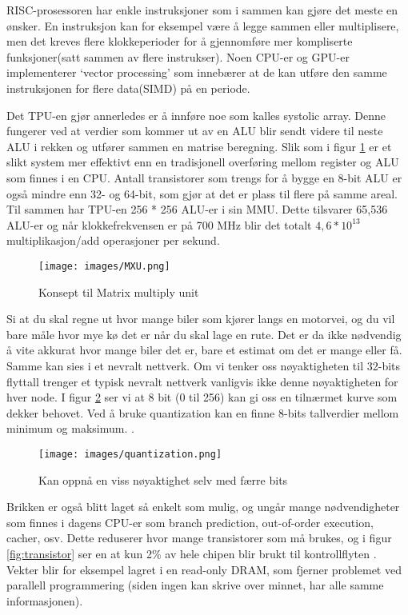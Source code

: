 RISC-prosessoren har enkle instruksjoner som i sammen kan gjøre det meste en ønsker. En instruksjon kan for eksempel være å legge sammen eller multiplisere, men det kreves flere klokkeperioder for å gjennomføre mer kompliserte funksjoner(satt sammen av flere instrukser). Noen CPU-er og GPU-er implementerer ‘vector processing’ \cite{look_at_TPU} som innebærer at de kan utføre den samme instruksjonen for flere data(SIMD) på en periode. 

Det TPU-en gjør annerledes er å innføre noe som kalles systolic array. Denne fungerer ved at verdier som kommer ut av en ALU blir sendt videre til neste ALU i rekken og utfører sammen en matrise beregning. Slik som i figur \ref{fig:mxu} er et slikt system mer effektivt enn en tradisjonell overføring mellom register og ALU som finnes i en CPU. Antall transistorer som trengs for å bygge en 8-bit ALU er også mindre enn 32- og 64-bit, som gjør at det er plass til flere på samme areal. Til sammen har TPU-en 256 * 256 ALU-er i sin MMU\cite{look_at_TPU}. Dette tilsvarer 65,536 ALU-er og når klokkefrekvensen er på 700 MHz blir det totalt $4,6 * 10^{13}$ multiplikasjon/add operasjoner per sekund. 

\begin{figure}[ht]
    \centering
    \texttt{[image: images/MXU.png]}
    \caption{Konsept til Matrix multiply unit}
    \label{fig:mxu}
\end{figure}

Si at du skal regne ut hvor mange biler som kjører langs en motorvei, og du vil bare måle hvor mye kø det er når du skal lage en rute. Det er da ikke nødvendig å vite akkurat hvor mange biler det er, bare et estimat om det er mange eller få. Samme kan sies i et nevralt nettverk. Om vi tenker oss nøyaktigheten til 32-bits flyttall trenger et typisk nevralt nettverk vanligvis ikke denne nøyaktigheten for hver node. I figur \ref{fig:quant} ser vi at 8 bit (0 til 256) kan gi oss en tilnærmet kurve som dekker behovet. Ved å bruke quantization kan en finne 8-bits tallverdier mellom minimum og maksimum. \cite{look_at_TPU}.
 
\begin{figure}[ht]
    \centering
    \texttt{[image: images/quantization.png]}
    \caption{Kan oppnå en viss nøyaktighet selv med færre bits}
    \label{fig:quant}
\end{figure}

Brikken er også blitt laget så enkelt som mulig, og ungår mange nødvendigheter som finnes i dagens CPU-er som branch prediction, out-of-order execution, cacher, osv. Dette reduserer hvor mange transistorer som må brukes, og  i figur \ref{fig:transistor} ser en at kun 2\% av hele chipen blir brukt til kontrollflyten \cite{tpu_main}. Vekter blir for eksempel lagret i en read-only DRAM, som fjerner problemet ved parallell programmering (siden ingen kan skrive over minnet, har alle samme informasjonen).

